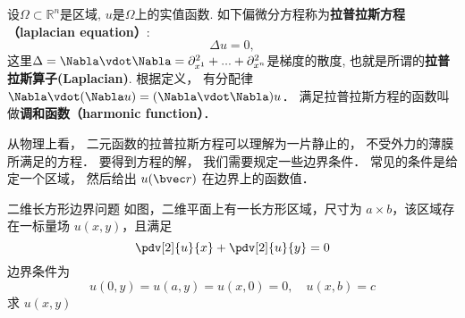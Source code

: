 
\begin{issues}
\issueDraft
\end{issues}


设$\Omega\subset\mathbb{R}^n$是区域, $u$是$\Omega$上的实值函数. 如下偏微分方程称为\textbf{拉普拉斯方程（laplacian equation）}:
\begin{equation}
\Delta u = 0,
\end{equation}
这里$\Delta=\Nabla\vdot\Nabla=\partial_{x^1}^2+...+\partial_{x^n}^2$是梯度的散度, 也就是所谓的\textbf{拉普拉斯算子(Laplacian)}. 根据定义， 有分配律 $\Nabla \vdot (\Nabla u) = (\Nabla \vdot \Nabla) u$． 满足拉普拉斯方程的函数叫做\textbf{调和函数（harmonic function）}．

从物理上看， 二元函数的拉普拉斯方程可以理解为一片静止的， 不受外力的薄膜所满足的方程． 要得到方程的解， 我们需要规定一些边界条件． 常见的条件是给定一个区域， 然后给出 $u(\bvec r)$ 在边界上的函数值．

\begin{example}{二维长方形边界问题}
如图，二维平面上有一长方形区域，尺寸为 $a\times b$，该区域存在一标量场 $u(x,y)$，且满足
\begin{equation}\label{LapEq_eq1}
\pdv[2]{u}{x}+\pdv[2]{u}{y}=0
\end{equation}
边界条件为
\begin{equation}
u(0,y)=u(a,y)=u(x,0)=0,\quad u(x,b)=c
\end{equation}
求 $u(x,y)$
\end{example}

